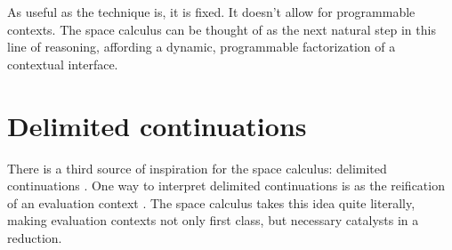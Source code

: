 As useful as the technique is, it is fixed. It doesn't allow for
programmable contexts. The space calculus can be thought of as the
next natural step in this line of reasoning, affording a dynamic,
programmable factorization of a contextual interface.

\section{Delimited continuations}
There is a third source of inspiration for the space calculus:
delimited continuations \cite{DBLP:journals/jfp/DybvigJS07}. One way
to interpret delimited continuations is as the reification of an
evaluation context \cite{DBLP:conf/icfp/AriolaHS04}. The space
calculus takes this idea quite literally, making evaluation contexts
not only first class, but necessary catalysts in a reduction.
